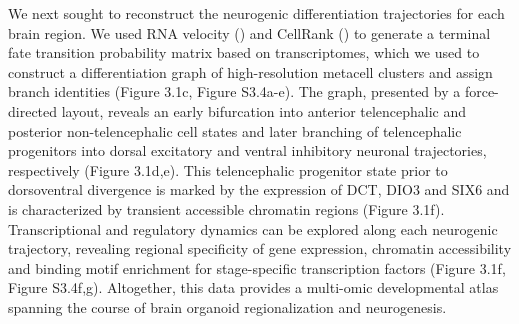 We next sought to reconstruct the neurogenic differentiation trajectories for each brain region. We used RNA velocity (\cite{manno_rna_2018,bergen_generalizing_2020}) and CellRank (\cite{lange_cellrank_2022}) to generate a terminal fate transition probability matrix based on transcriptomes, which we used to construct a differentiation graph of high-resolution metacell clusters and assign branch identities (Figure 3.1c, Figure S3.4a-e). The graph, presented by a force-directed layout, reveals an early bifurcation into anterior telencephalic and posterior non-telencephalic cell states and later branching of telencephalic progenitors into dorsal excitatory and ventral inhibitory neuronal trajectories, respectively (Figure 3.1d,e). This telencephalic progenitor state prior to dorsoventral divergence is marked by the expression of DCT, DIO3 and SIX6 and is characterized by transient accessible chromatin regions (Figure 3.1f). Transcriptional and regulatory dynamics can be explored along each neurogenic trajectory, revealing regional specificity of gene expression, chromatin accessibility and binding motif enrichment for stage-specific transcription factors (Figure 3.1f, Figure S3.4f,g). Altogether, this data provides a multi-omic developmental atlas spanning the course of brain organoid regionalization and neurogenesis.
 


